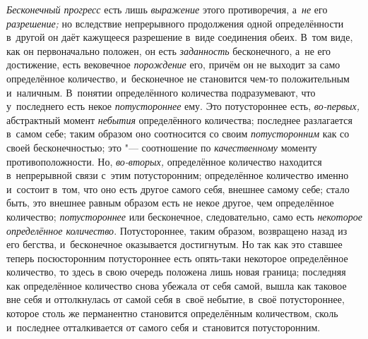 {\em Бесконечный прогресс} есть лишь {\em выражение} этого противоречия,
а~{\em не} его {\em разрешение;} но вследствие непрерывного продолжения одной
определённости в~другой он даёт кажущееся разрешение в~виде соединения обеих. В~том
виде, как он первоначально положен, он есть {\em заданность}
бесконечного, а~не его достижение, есть вековечное {\em порождение} его, причём
он не выходит за само определённое количество, и~бесконечное не становится
чем-то положительным и~наличным. В~понятии определённого количества
подразумевают, что у~последнего есть некое {\em потустороннее} ему. Это
потустороннее есть, {\em во-первых,} абстрактный момент {\em небытия}
определённого количества; последнее разлагается в~самом себе; таким образом оно
соотносится со своим {\em потусторонним} как со своей бесконечностью; это "---
соотношение по {\em качественному} моменту противоположности. Но,
{\em во-вторых,} определённое количество находится в~непрерывной связи с~этим
потусторонним; определённое количество именно и~состоит в~том, что оно есть
другое самого себя, внешнее самому себе; стало быть, это внешнее равным образом
есть не некое другое, чем определённое количество; {\em потустороннее} или
бесконечное, следовательно, само есть {\em некоторое определённое количество}.
Потустороннее, таким образом, возвращено назад из его бегства, и~бесконечное
оказывается достигнутым. Но так как это ставшее теперь посюсторонним
потустороннее есть опять-таки некоторое определённое количество, то здесь
в свою очередь положена лишь новая граница; последняя как определённое
количество снова убежала от себя самой, вышла как таковое вне себя и
оттолкнулась от самой себя в~своё небытие, в~своё потустороннее, которое столь
же перманентно становится определённым количеством, сколь и~последнее
отталкивается от самого себя и~становится потусторонним.

